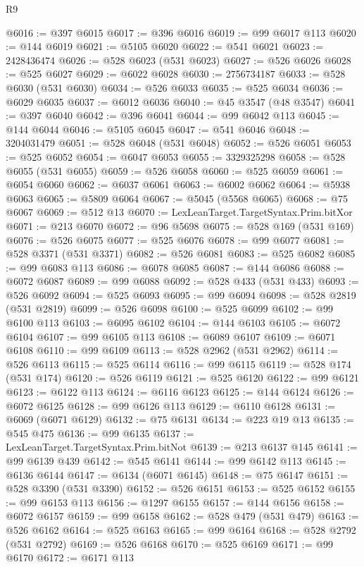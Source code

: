 \begin{lexlean}{R9}
\begin{coremodule}
{{{{{{{{{{{{{{{{{{{{{{{{{{{{{{{{{{{{{{{{{{{{{{{{{{{{{{{{{{{{{{{{{{{{{{{{{{{{{{{{{{{{@6016 := @397 @6015
@6017 := @396 @6016
@6019 := @99 @6017 @113
@6020 := @144 @6019
@6021 := @5105 @6020
@6022 := @541 @6021
@6023 := 2428436474
@6026 := @528 @6023 (@531 @6023)
@6027 := @526 @6026
@6028 := @525 @6027
@6029 := @6022 @6028
@6030 := 2756734187
@6033 := @528 @6030 (@531 @6030)
@6034 := @526 @6033
@6035 := @525 @6034
@6036 := @6029 @6035
@6037 := @6012 @6036
@6040 := @45 @3547 (@48 @3547)
@6041 := @397 @6040
@6042 := @396 @6041
@6044 := @99 @6042 @113
@6045 := @144 @6044
@6046 := @5105 @6045
@6047 := @541 @6046
@6048 := 3204031479
@6051 := @528 @6048 (@531 @6048)
@6052 := @526 @6051
@6053 := @525 @6052
@6054 := @6047 @6053
@6055 := 3329325298
@6058 := @528 @6055 (@531 @6055)
@6059 := @526 @6058
@6060 := @525 @6059
@6061 := @6054 @6060
@6062 := @6037 @6061
@6063 := @6002 @6062
@6064 := @5938 @6063
@6065 := @5809 @6064
@6067 := @5045 (@5568 @6065)
@6068 := @75 @6067
@6069 := @512 @13
@6070 := LexLeanTarget.TargetSyntax.Prim.bitXor
@6071 := @213 @6070
@6072 := @96 @5698
@6075 := @528 @169 (@531 @169)
@6076 := @526 @6075
@6077 := @525 @6076
@6078 := @99 @6077
@6081 := @528 @3371 (@531 @3371)
@6082 := @526 @6081
@6083 := @525 @6082
@6085 := @99 @6083 @113
@6086 := @6078 @6085
@6087 := @144 @6086
@6088 := @6072 @6087
@6089 := @99 @6088
@6092 := @528 @433 (@531 @433)
@6093 := @526 @6092
@6094 := @525 @6093
@6095 := @99 @6094
@6098 := @528 @2819 (@531 @2819)
@6099 := @526 @6098
@6100 := @525 @6099
@6102 := @99 @6100 @113
@6103 := @6095 @6102
@6104 := @144 @6103
@6105 := @6072 @6104
@6107 := @99 @6105 @113
@6108 := @6089 @6107
@6109 := @6071 @6108
@6110 := @99 @6109
@6113 := @528 @2962 (@531 @2962)
@6114 := @526 @6113
@6115 := @525 @6114
@6116 := @99 @6115
@6119 := @528 @174 (@531 @174)
@6120 := @526 @6119
@6121 := @525 @6120
@6122 := @99 @6121
@6123 := @6122 @113
@6124 := @6116 @6123
@6125 := @144 @6124
@6126 := @6072 @6125
@6128 := @99 @6126 @113
@6129 := @6110 @6128
@6131 := @6069 (@6071 @6129)
@6132 := @75 @6131
@6134 := @223 @19 @13
@6135 := @545 @475
@6136 := @99 @6135
@6137 := LexLeanTarget.TargetSyntax.Prim.bitNot
@6139 := @213 @6137 @145
@6141 := @99 @6139 @439
@6142 := @545 @6141
@6144 := @99 @6142 @113
@6145 := @6136 @6144
@6147 := @6134 (@6071 @6145)
@6148 := @75 @6147
@6151 := @528 @3390 (@531 @3390)
@6152 := @526 @6151
@6153 := @525 @6152
@6155 := @99 @6153 @113
@6156 := @1297 @6155
@6157 := @144 @6156
@6158 := @6072 @6157
@6159 := @99 @6158
@6162 := @528 @479 (@531 @479)
@6163 := @526 @6162
@6164 := @525 @6163
@6165 := @99 @6164
@6168 := @528 @2792 (@531 @2792)
@6169 := @526 @6168
@6170 := @525 @6169
@6171 := @99 @6170
@6172 := @6171 @113
}}}}}}}}}}}}}}}}}}}}}}}}}}}}}}}}}}}}}}}}}}}}}}}}}}}}}}}}}}}}}}}}}}}}}}}}}}}}}}}}}}}}
\end{coremodule}
\end{lexlean}

